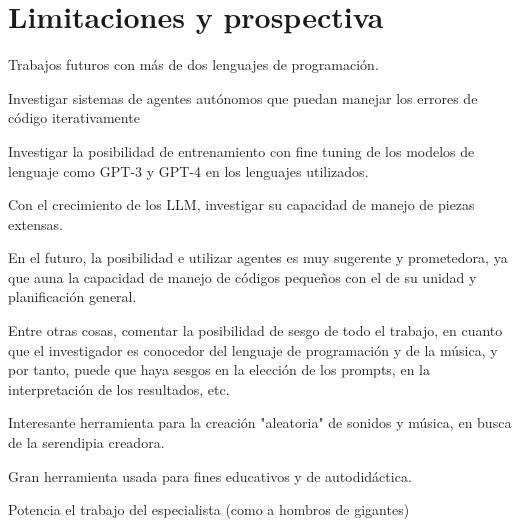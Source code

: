 \chapter{Limitaciones y prospectiva}


Trabajos futuros con más de dos lenguajes de programación.

Investigar sistemas de agentes autónomos que puedan manejar los errores de código iterativamente

Investigar la posibilidad de entrenamiento con fine tuning de los modelos de lenguaje como GPT-3 y GPT-4 en los lenguajes utilizados.

Con el crecimiento de los LLM, investigar su capacidad de manejo de piezas extensas.

En el futuro, la posibilidad e utilizar agentes es muy sugerente y prometedora, ya que auna la capacidad de manejo de códigos pequeños con el de su unidad y planificación general.

Entre otras cosas, comentar la posibilidad de sesgo de todo el trabajo, en cuanto que el investigador es conocedor del lenguaje de programación y de la música, y por tanto, puede que haya sesgos en la elección de los prompts, en la interpretación de los resultados, etc.

Interesante herramienta para la creación "aleatoria" de sonidos y música, en busca de la serendipia creadora.

Gran herramienta usada para fines educativos y de autodidáctica.

Potencia el trabajo del especialista (como a hombros de gigantes)

